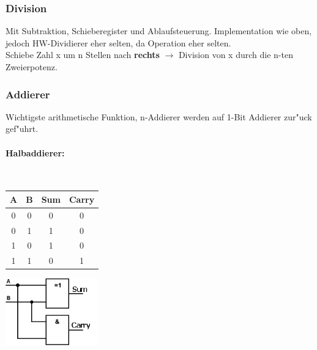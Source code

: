 \subsubsection{Division}
Mit Subtraktion, Schieberegister und Ablaufsteuerung. 
Implementation wie oben, jedoch HW-Dividierer eher selten, da Operation eher selten.\\
Schiebe Zahl x um n Stellen nach \textbf{rechts} $\rightarrow$ Division von x durch die n-ten Zweierpotenz.
\subsubsection{Addierer}
Wichtigste arithmetische Funktion, n-Addierer werden auf 1-Bit Addierer zur"uck gef"uhrt.
\paragraph{Halbaddierer:}~\\
\begin{minipage}{0.5\textwidth}
	\centering
	\begin{tabular}{|c | c | c | c |}
		\hline
		A & B & Sum & Carry\\
		\hline
		0 & 0 & 0 & 0\\
		\hline
		0 & 1 & 1 & 0\\
		\hline
		1 & 0 & 1 & 0\\
		\hline
		1 & 1 & 0 & 1\\
		\hline
	\end{tabular}
\end{minipage}
\begin{minipage}{0.9\textwidth}
	\centering
	\begin{flushleft}
		{\includegraphics[width=0.3\textwidth]{images/Arithmetik/halbaddierer.png}}
		\label{Fig: Halbaddierer}
	\end{flushleft}
\end{minipage}\\ \\

